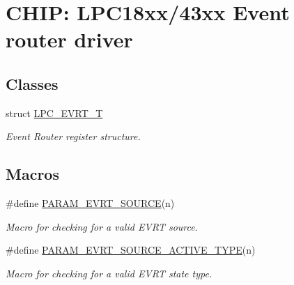 \hypertarget{group___e_v_r_t__18_x_x__43_x_x}{}\section{C\+H\+IP\+: L\+P\+C18xx/43xx Event router driver}
\label{group___e_v_r_t__18_x_x__43_x_x}
\subsection*{Classes}
\begin{DoxyCompactItemize}
\item 
struct \hyperlink{struct_l_p_c___e_v_r_t___t}{L\+P\+C\+\_\+\+E\+V\+R\+T\+\_\+T}
\begin{DoxyCompactList}\small\item\em Event Router register structure. \end{DoxyCompactList}\end{DoxyCompactItemize}
\subsection*{Macros}
\begin{DoxyCompactItemize}
\item 
\#define \hyperlink{group___e_v_r_t__18_x_x__43_x_x_ga2475491cb73d4089705caa28008c8634}{P\+A\+R\+A\+M\+\_\+\+E\+V\+R\+T\+\_\+\+S\+O\+U\+R\+CE}(n)
\begin{DoxyCompactList}\small\item\em Macro for checking for a valid E\+V\+RT source. \end{DoxyCompactList}\item 
\#define \hyperlink{group___e_v_r_t__18_x_x__43_x_x_ga258c7be7764bf695a3e958d2caee184a}{P\+A\+R\+A\+M\+\_\+\+E\+V\+R\+T\+\_\+\+S\+O\+U\+R\+C\+E\+\_\+\+A\+C\+T\+I\+V\+E\+\_\+\+T\+Y\+PE}(n)
\begin{DoxyCompactList}\small\item\em Macro for checking for a valid E\+V\+RT state type. \end{DoxyCompactList}\end{DoxyCompactItemize}
